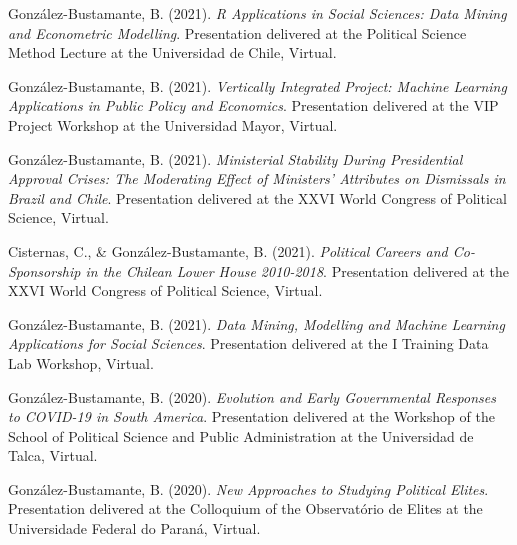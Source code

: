 \begin{publications}
\begin{benumerate}{72}
\item{\small González-Bustamante, B. (2021). {\itshape R Applications in Social Sciences: Data Mining and Econometric Modelling}. Presentation delivered at the Political Science Method Lecture at the Universidad de Chile, Virtual.}\vspace{1mm}

\item{\small González-Bustamante, B. (2021). {\itshape Vertically Integrated Project: Machine Learning Applications in Public Policy and Economics}. Presentation delivered at the VIP Project Workshop at the Universidad Mayor, Virtual.}\vspace{1mm}

\item{\small González-Bustamante, B. (2021). {\itshape Ministerial Stability During Presidential Approval Crises: The Moderating Effect of Ministers' Attributes on Dismissals in Brazil and Chile}. Presentation delivered at the XXVI World Congress of Political Science, Virtual.}\vspace{1mm}

\item{\small Cisternas, C., \& González-Bustamante, B. (2021). {\itshape Political Careers and Co-Sponsorship in the Chilean Lower House 2010-2018}. Presentation delivered at the XXVI World Congress of Political Science, Virtual.}\vspace{1mm}

\item{\small González-Bustamante, B. (2021). {\itshape Data Mining, Modelling and Machine Learning Applications for Social Sciences}. Presentation delivered at the I Training Data Lab Workshop, Virtual.}\vspace{1mm}

\item{\small González-Bustamante, B. (2020). {\itshape Evolution and Early Governmental Responses to COVID-19 in South America}. Presentation delivered at the Workshop of the School of Political Science and Public Administration at the Universidad de Talca, Virtual.}\vspace{1mm}

\item{\small González-Bustamante, B. (2020). {\itshape New Approaches to Studying Political Elites}. Presentation delivered at the Colloquium of the Observatório de Elites at the Universidade Federal do Paraná, Virtual.}\vspace{1mm}


\end{benumerate}
\end{publications}
